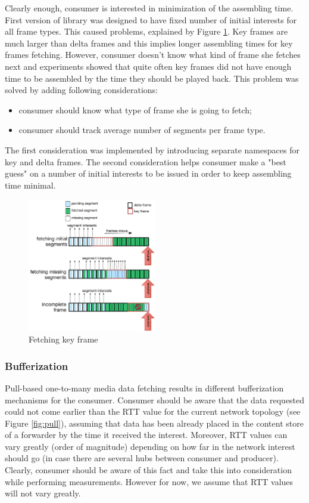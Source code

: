 \documentclass[10pt]{proc}
\begin{document}
Clearly enough, consumer is interested in minimization of the assembling time. First version of library was designed to have fixed number of initial interests for all frame types. This caused problems, explained by Figure \ref{fig:fetch-key}. Key frames are much larger than delta frames and this implies longer assembling times for key frames fetching. However, consumer doesn't know what kind of frame she fetches next and experiments showed that quite often key frames did not have enough time to be assembled by the time they should be played back. This problem was solved by adding following considerations:
\begin{itemize}
\item consumer should know what type of frame she is going to fetch;
\item consumer should track average number of segments per frame type.
\end{itemize}

The first consideration was implemented by introducing separate namespaces for key and delta frames. The second consideration helps consumer make a "best guess" on a number of initial interests to be issued in order to keep assembling time minimal.

\begin{figure}[Ht!]
\centering
\includegraphics[width=0.5\textwidth]{key-fetch}
\caption{Fetching key frame}
\label{fig:fetch-key}
\end{figure}


\subsubsection{Bufferization}

Pull-based one-to-many media data fetching results in different bufferization mechanisms for the consumer. Consumer should be aware that the data requested could not come earlier than the RTT value for the current network topology (see Figure \ref{fig:pull}), assuming that data has been already placed in the content store of a forwarder by the time it received the interest. Moreover, RTT values can vary greatly (order of magnitude) depending on how far in the network interest should go (in case there are several hubs between consumer and producer). Clearly, consumer should be aware of this fact and take this into consideration while performing measurements. However for now, we assume that RTT values will not vary greatly.
\end{document}
